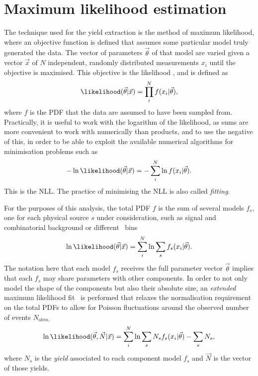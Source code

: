 \chapter{Maximum likelihood estimation}
\label{chap:mle}

The technique used for the yield extraction is the method of maximum 
likelihood, where an objective function is defined that assumes some particular 
model truly generated the data.
The vector of parameters $\vec{\theta}$ of that model are varied given a vector 
$\vec{x}$ of $N$ independent, randomly distributed measurements $x_{i}$ until 
the objective is maximised.
This objective is the likelihood \likelihood, and is defined as
\begin{equation}
  \likelihood(\vec{\theta}|\vec{x}) = \prod_{i}^{N} f(x_{i}|\vec{\theta}),
\end{equation}
where $f$ is the \ac{PDF} that the data are assumed to have been sampled 
from.\footnotemark
Practically, it is useful to work with the logarithm of the likelihood, as sums 
are more convenient to work with numerically than products, and to use the 
negative of this, in order to be able to exploit the available numerical 
algorithms for minimisation problems such as \minuit~\cite{James:1975dr}
\begin{equation}
  -\ln{\likelihood(\vec{\theta}|\vec{x})} =
  -\sum_{i}^{N} \ln{f(x_{i}|\vec{\theta})}.
\end{equation}
This is the \acf{NLL}.
The practice of minimising the \ac{NLL} is also called \emph{fitting}.


For the purposes of this analysis, the total \ac{PDF} $f$ is the sum of several 
models $f_{s}$, one for each physical source $s$ under consideration, such as 
signal and combinatorial background or different \pTy\ bins
\begin{equation}
  \ln{\likelihood(\vec{\theta}|\vec{x})} =
  \sum_{i}^{N} \ln{\sum_{s} f_{s}(x_{i}|\vec{\theta})}.
\end{equation}
The notation here that each model $f_{s}$ receives the full parameter vector 
$\vec{\theta}$ implies that each $f_{s}$ may share parameters with other 
components.
In order to not only model the shape of the components but also their absolute 
size, an \emph{extended} maximum likelihood fit~\cite{Barlow:1990vc} is 
performed that relaxes the normalisation requirement on the total \acp{PDF} to 
allow for Poisson fluctuations around the observed number of events 
$N_{\text{obvs.}}$
\begin{equation}
  \ln{\likelihood(\vec{\theta}, \vec{N}|\vec{x})} =
  \sum_{i}^{N}
    \ln{\sum_{s} N_{s}f_{s}(x_{i}|\vec{\theta})}
    - \sum_{s} N_{s}
  ,
\end{equation}
where $N_{s}$ is the \emph{yield} associated to each component model $f_{s}$ 
and $\vec{N}$ is the vector of those yields.

